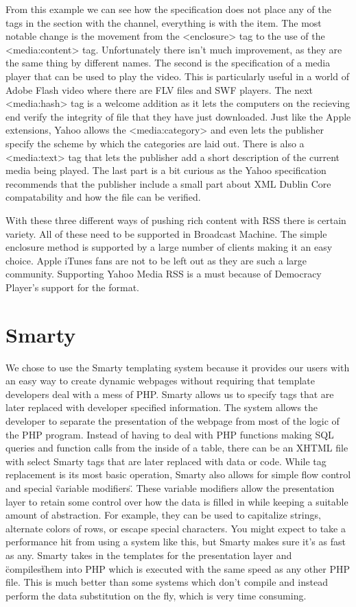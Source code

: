 \documentclass[a4paper,12pt]{report}
\begin{document}
From this example we can see how the specification does not place any of the tags in the section with the channel, everything is with the item.
The most notable change is the movement from the <enclosure> tag to the use of the <media:content> tag.
Unfortunately there isn't much improvement, as they are the same thing by different names.
The second is the specification of a media player that can be used to play the video.
This is particularly useful in a world of Adobe Flash video where there are FLV files and SWF players.
The next <media:hash> tag is a welcome addition as it lets the computers on the recieving end verify the integrity of file that they have just downloaded.
Just like the Apple extensions, Yahoo allows the <media:category> and even lets the publisher specify the scheme by which the categories are laid out.
There is also a <media:text> tag that lets the publisher add a short description of the current media being played.
The last part is a bit curious as the Yahoo specification recommends that the publisher include a small part about XML Dublin Core compatability and how the file can be verified.

With these three different ways of pushing rich content with RSS there is certain variety.
All of these need to be supported in Broadcast Machine.
The simple enclosure method is supported by a large number of clients making it an easy choice.
Apple iTunes fans are not to be left out as they are such a large community.
Supporting Yahoo Media RSS is a must because of Democracy Player's support for the format.


\section{Smarty}
We chose to use the Smarty templating system because it provides our users with an easy way to create dynamic webpages without requiring that template developers deal with a mess of PHP. 
Smarty allows us to specify tags that are later replaced with developer specified information.
The system allows the developer to separate the presentation of the webpage from most of the logic of the PHP program. 
Instead of having to deal with PHP functions making SQL queries and function calls from the inside of a table, there can be an XHTML file with select Smarty tags that are later replaced with data or code.
While tag replacement is its most basic operation, Smarty also allows for simple flow control and special \"variable modifiers\".
These variable modifiers allow the presentation layer to retain some control over how the data is filled in while keeping a suitable amount of abstraction.
For example, they can be used to capitalize strings, alternate colors of rows, or escape special characters.
You might expect to take a performance hit from using a system like this, but Smarty makes sure it's as fast as any.
Smarty takes in the templates for the presentation layer and \"compiles\" them into PHP which is executed with the same speed as any other PHP file.
This is much better than some systems which don't compile and instead perform the data substitution on the fly, which is very time consuming. 
\end{document}
